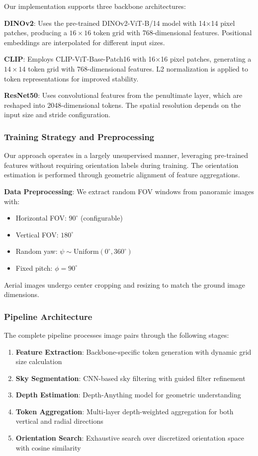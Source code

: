 \documentclass{bmvc2k}
\begin{document}
Our implementation supports three backbone architectures:

\textbf{DINOv2}: Uses the pre-trained DINOv2-ViT-B/14 model with 14×14 pixel patches, producing a $16 \times 16$ token grid with 768-dimensional features. Positional embeddings are interpolated for different input sizes.

\textbf{CLIP}: Employs CLIP-ViT-Base-Patch16 with 16×16 pixel patches, generating a $14 \times 14$ token grid with 768-dimensional features. L2 normalization is applied to token representations for improved stability.

\textbf{ResNet50}: Uses convolutional features from the penultimate layer, which are reshaped into 2048-dimensional tokens. The spatial resolution depends on the input size and stride configuration.

\subsubsection{Training Strategy and Preprocessing}

Our approach operates in a largely unsupervised manner, leveraging pre-trained features without requiring orientation labels during training. The orientation estimation is performed through geometric alignment of feature aggregations.

\textbf{Data Preprocessing}: We extract random FOV windows from panoramic images with:
\begin{itemize}
    \item Horizontal FOV: $90^\circ$ (configurable)
    \item Vertical FOV: $180^\circ$ 
    \item Random yaw: $\psi \sim \text{Uniform}(0^\circ, 360^\circ)$
    \item Fixed pitch: $\phi = 90^\circ$
\end{itemize}

Aerial images undergo center cropping and resizing to match the ground image dimensions.

\subsubsection{Pipeline Architecture}

The complete pipeline processes image pairs through the following stages:
\begin{enumerate}
    \item \textbf{Feature Extraction}: Backbone-specific token generation with dynamic grid size calculation
    \item \textbf{Sky Segmentation}: CNN-based sky filtering with guided filter refinement
    \item \textbf{Depth Estimation}: Depth-Anything model for geometric understanding
    \item \textbf{Token Aggregation}: Multi-layer depth-weighted aggregation for both vertical and radial directions
    \item \textbf{Orientation Search}: Exhaustive search over discretized orientation space with cosine similarity
\end{enumerate}
\end{document}
